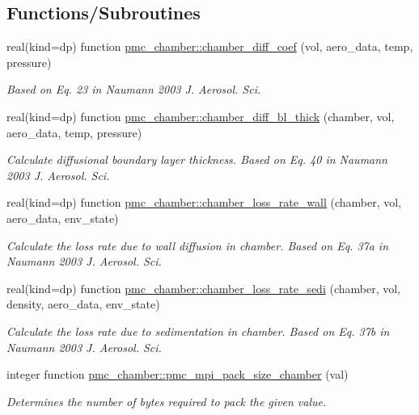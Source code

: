 \subsection*{Functions/\+Subroutines}
\begin{DoxyCompactItemize}
\item 
real(kind=dp) function \mbox{\hyperlink{namespacepmc__chamber_a2460ba62fd341138dcd48ab0ce8d2ee0}{pmc\+\_\+chamber\+::chamber\+\_\+diff\+\_\+coef}} (vol, aero\+\_\+data, temp, pressure)
\begin{DoxyCompactList}\small\item\em Based on Eq. 23 in Naumann 2003 J. Aerosol. Sci. \end{DoxyCompactList}\item 
real(kind=dp) function \mbox{\hyperlink{namespacepmc__chamber_a915f3d6e535e4f3a792faf470e74aa59}{pmc\+\_\+chamber\+::chamber\+\_\+diff\+\_\+bl\+\_\+thick}} (chamber, vol, aero\+\_\+data, temp, pressure)
\begin{DoxyCompactList}\small\item\em Calculate diffusional boundary layer thickness. Based on Eq. 40 in Naumann 2003 J. Aerosol. Sci. \end{DoxyCompactList}\item 
real(kind=dp) function \mbox{\hyperlink{namespacepmc__chamber_a0a0fd4cf1b9ff4af75d0df89cf2c0c4e}{pmc\+\_\+chamber\+::chamber\+\_\+loss\+\_\+rate\+\_\+wall}} (chamber, vol, aero\+\_\+data, env\+\_\+state)
\begin{DoxyCompactList}\small\item\em Calculate the loss rate due to wall diffusion in chamber. Based on Eq. 37a in Naumann 2003 J. Aerosol. Sci. \end{DoxyCompactList}\item 
real(kind=dp) function \mbox{\hyperlink{namespacepmc__chamber_adfd6bc1ce1607e8180e56f2420c3fb0f}{pmc\+\_\+chamber\+::chamber\+\_\+loss\+\_\+rate\+\_\+sedi}} (chamber, vol, density, aero\+\_\+data, env\+\_\+state)
\begin{DoxyCompactList}\small\item\em Calculate the loss rate due to sedimentation in chamber. Based on Eq. 37b in Naumann 2003 J. Aerosol. Sci. \end{DoxyCompactList}\item 
integer function \mbox{\hyperlink{namespacepmc__chamber_a0605211b3a313af86170ab1e7240c336}{pmc\+\_\+chamber\+::pmc\+\_\+mpi\+\_\+pack\+\_\+size\+\_\+chamber}} (val)
\begin{DoxyCompactList}\small\item\em Determines the number of bytes required to pack the given value. \end{DoxyCompactList}\item 

\end{DoxyCompactItemize}
